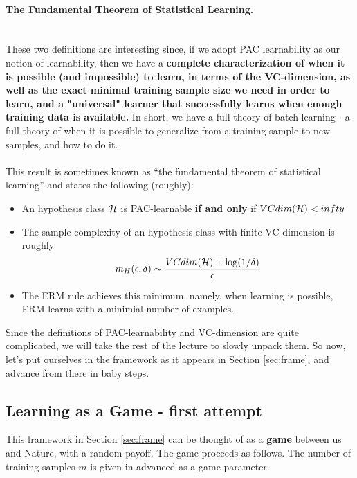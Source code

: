 {\paragraph{The Fundamental Theorem of Statistical Learning.}
~\\
These two definitions are interesting since, if we adopt PAC learnability as our
notion of learnability, then we have a {\bf complete characterization of when it
is possible (and impossible) to learn, in terms of the VC-dimension, as well as  the exact minimal  training sample size we need in order to learn, and a "universal" learner that successfully learns when enough training data is available. } In short, we have a full theory of batch learning - a full theory of when it is possible to generalize from a training sample to new samples, and how to do it.
\\~\\
This result is sometimes known as ``the fundamental theorem of statistical
learning'' and states the following (roughly):
\begin{itemize}
  \item An hypothesis class $\mathcal{H}$ is PAC-learnable {\bf if and only} if
    $VCdim(\mathcal{H})<infty$
  \item The sample complexity of an hypothesis class with finite VC-dimension is
    roughly\[
m_H(\epsilon,\delta) \sim \frac{VCdim(\mathcal{H})+\log(1/\delta)}{\epsilon}
\]
\item The ERM rule achieves this minimum, namely, when learning is possible, ERM
  learns with a minimial number of examples.
\end{itemize}

Since the definitions of PAC-learnability and VC-dimension are quite complicated, we will take the rest of the lecture to slowly unpack them. So now, let's put ourselves in the framework as it appears in Section \ref{sec:frame}, and advance from there in baby steps. 

\subsection{Learning as a Game - first attempt}

This framework in Section \ref{sec:frame} can be thought of as a {\bf game} between us and Nature, with a random payoff. The game proceeds as follows. The number of training samples $m$ is given in advanced as a game parameter. \\

}
